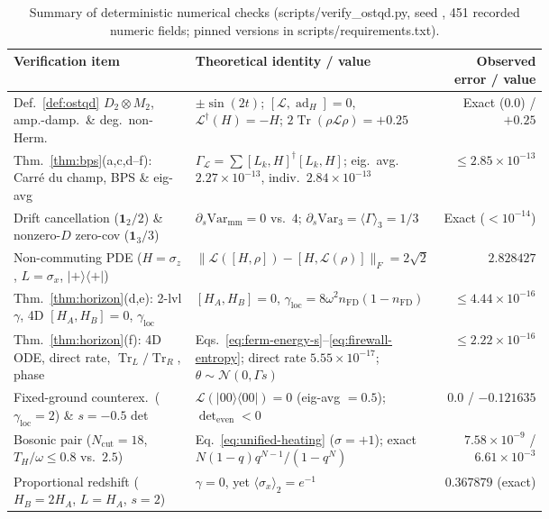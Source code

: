 \documentclass[11pt,a4paper]{article}
\theoremstyle{definition}
\theoremstyle{remark}
\newcommand{\Tr}{\operatorname{Tr}}
\newcommand{\ad}{\operatorname{ad}}
\newcommand{\cL}{\mathcal{L}}
\newcommand{\1}{\mathbf{1}}
\newcommand{\normF}[1]{\|#1\|_F}
\newcommand{\code}[1]{{\footnotesize\ttfamily #1}}
\begin{document}
\begin{table}[!tbp]
\centering\scriptsize
\caption{Summary of deterministic numerical checks (\code{scripts/verify\_\allowbreak ostqd.py}, seed \code{20261126}, 451 recorded numeric fields; pinned versions in \code{scripts/requirements.txt}).}
\label{tab:numerics}
\begin{tabular}{@{}>{\raggedright\arraybackslash}p{0.34\linewidth}>{\raggedright\arraybackslash}p{0.35\linewidth}r@{}}
\toprule
Verification item & Theoretical identity / value & Observed error / value \\
\midrule
Def.~\ref{def:ostqd} $D_2\otimes M_2$, amp.-damp.\ \& deg.\ non-Herm. & $\pm\sin(2t)$; $[\cL,\ad_H]=0$, $\cL^\dagger(H)=-H$; $2\Tr(\rho\cL\rho)=+0.25$ & Exact ($0.0$) / $+0.25$ \\
Thm.~\ref{thm:bps}(a,c,d--f): Carr\'e du champ, BPS \& eig-avg & $\Gamma_{\cL}=\sum [L_k,H]^\dagger[L_k,H]$; eig.\ avg.\ $2.27\times 10^{-13}$, indiv.\ $2.84\times 10^{-13}$ & $\le 2.85\times 10^{-13}$ \\
Drift cancellation ($\1_2/2$) \& nonzero-$D$ zero-cov ($\1_3/3$) & $\partial_s\mathrm{Var}_{\mathrm{mm}}=0$ vs.\ $4$; $\partial_s\mathrm{Var}_{3}=\langle\Gamma\rangle_3=1/3$ & Exact ($<10^{-14}$) \\
Non-commuting PDE ($H=\sigma_z$, $L=\sigma_x$, $|+\rangle\langle +|$) & $\normF{\cL([H,\rho])-[H,\cL(\rho)]}=2\sqrt{2}$ & $2.828427$ \\
Thm.~\ref{thm:horizon}(d,e): 2-lvl $\gamma$, 4D $[H_A,H_B]=0$, $\gamma_{\mathrm{loc}}$ & $[H_A,H_B]=0$, $\gamma_{\mathrm{loc}}=8\omega^2 n_{\mathrm{FD}}(1-n_{\mathrm{FD}})$ & $\le 4.44\times 10^{-16}$ \\
Thm.~\ref{thm:horizon}(f): 4D ODE, direct rate, $\Tr_L/\Tr_R$, phase & Eqs.~\eqref{eq:ferm-energy-s}--\eqref{eq:firewall-entropy}; direct rate $5.55\times 10^{-17}$; $\theta\sim\mathcal{N}(0,\Gamma s)$ & $\le 2.22\times 10^{-16}$ \\
Fixed-ground counterex.\ ($\gamma_{\mathrm{loc}}=2$) \& $s=-0.5$ det & $\cL(|00\rangle\langle 00|)=0$ (eig-avg $=0.5$); $\det_{\mathrm{even}}<0$ & $0.0$ / $-0.121635$ \\
Bosonic pair ($N_{\mathrm{cut}}=18$, $T_H/\omega \le 0.8$ vs.\ $2.5$) & Eq.~\eqref{eq:unified-heating} ($\sigma=+1$); exact $N(1-q)q^{N-1}/(1-q^N)$ & $7.58\times 10^{-9}$ / $6.61\times 10^{-3}$ \\
Proportional redshift ($H_B=2H_A$, $L=H_A$, $s=2$) & $\gamma=0$, yet $\langle\sigma_x\rangle_2 = e^{-1}$ & $0.367879$ (exact) \\

\end{tabular}
\end{table}
\end{document}
